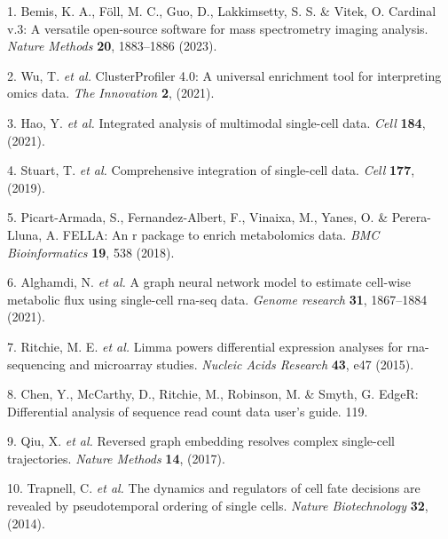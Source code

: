 \documentclass[
]{article}
\newenvironment{cslreferences}%
  {}%
  {\par}
\begin{document}
\hypertarget{refs}{}
\begin{cslreferences}
\leavevmode\hypertarget{ref-CardinalV3ABemis2023}{}%
1. Bemis, K. A., Föll, M. C., Guo, D., Lakkimsetty, S. S. \& Vitek, O. Cardinal v.3: A versatile open-source software for mass spectrometry imaging analysis. \emph{Nature Methods} \textbf{20}, 1883--1886 (2023).

\leavevmode\hypertarget{ref-ClusterprofilerWuTi2021}{}%
2. Wu, T. \emph{et al.} ClusterProfiler 4.0: A universal enrichment tool for interpreting omics data. \emph{The Innovation} \textbf{2}, (2021).

\leavevmode\hypertarget{ref-IntegratedAnalHaoY2021}{}%
3. Hao, Y. \emph{et al.} Integrated analysis of multimodal single-cell data. \emph{Cell} \textbf{184}, (2021).

\leavevmode\hypertarget{ref-ComprehensiveIStuart2019}{}%
4. Stuart, T. \emph{et al.} Comprehensive integration of single-cell data. \emph{Cell} \textbf{177}, (2019).

\leavevmode\hypertarget{ref-FellaAnRPacPicart2018}{}%
5. Picart-Armada, S., Fernandez-Albert, F., Vinaixa, M., Yanes, O. \& Perera-Lluna, A. FELLA: An r package to enrich metabolomics data. \emph{BMC Bioinformatics} \textbf{19}, 538 (2018).

\leavevmode\hypertarget{ref-AGraphNeuralAlgham2021}{}%
6. Alghamdi, N. \emph{et al.} A graph neural network model to estimate cell-wise metabolic flux using single-cell rna-seq data. \emph{Genome research} \textbf{31}, 1867--1884 (2021).

\leavevmode\hypertarget{ref-LimmaPowersDiRitchi2015}{}%
7. Ritchie, M. E. \emph{et al.} Limma powers differential expression analyses for rna-sequencing and microarray studies. \emph{Nucleic Acids Research} \textbf{43}, e47 (2015).

\leavevmode\hypertarget{ref-EdgerDifferenChen}{}%
8. Chen, Y., McCarthy, D., Ritchie, M., Robinson, M. \& Smyth, G. EdgeR: Differential analysis of sequence read count data user's guide. 119.

\leavevmode\hypertarget{ref-ReversedGraphQiuX2017}{}%
9. Qiu, X. \emph{et al.} Reversed graph embedding resolves complex single-cell trajectories. \emph{Nature Methods} \textbf{14}, (2017).

\leavevmode\hypertarget{ref-TheDynamicsAnTrapne2014}{}%
10. Trapnell, C. \emph{et al.} The dynamics and regulators of cell fate decisions are revealed by pseudotemporal ordering of single cells. \emph{Nature Biotechnology} \textbf{32}, (2014).


\end{cslreferences}
\end{document}
